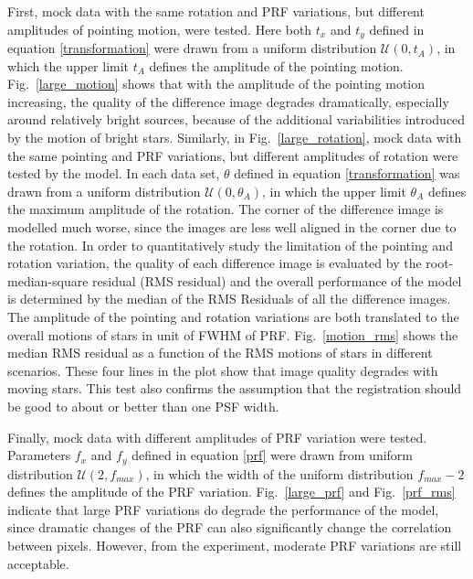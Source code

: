 First, mock data with the same rotation and PRF variations, but different amplitudes of pointing motion, were tested.
Here both $t_x$ and $t_y$ defined in equation \ref{transformation} were drawn from a uniform distribution ${\mathcal {U}}(0,t_A)$, in which the upper limit $t_A$ defines the amplitude of the pointing motion.
Fig.~\ref{large_motion} shows that with the amplitude of the pointing motion increasing,  the quality of the difference image degrades dramatically, especially around relatively bright sources, because of the additional variabilities introduced by the motion of bright stars.
Similarly, in Fig.~\ref{large_rotation}, mock data with the same pointing and PRF variations, but different amplitudes of rotation were tested by the model.
In each data set, $\theta$ defined in equation \ref{transformation} was drawn from a uniform distribution ${\mathcal {U}}(0,\theta_A)$, in which the upper limit $\theta_A$ defines the maximum amplitude of the rotation.
The corner of the difference image is modelled much worse, since the images are less well aligned in the corner due to the rotation. 
In order to quantitatively study the limitation of the pointing and rotation variation, the quality of each difference image is evaluated by the root-median-square residual (RMS residual) and the overall performance of the model is determined by the median of the RMS Residuals of all the difference images.
The amplitude of the pointing and rotation variations are both translated to the overall motions of stars in unit of FWHM of PRF.
Fig.~\ref{motion_rms} shows the median RMS residual as a function of the RMS motions of stars in different scenarios. 
These four lines in the plot show that image quality degrades with moving stars.
This test also confirms the assumption that the registration should be good to about or better than one PSF width.

Finally, mock data with different amplitudes of PRF variation were tested.
Parameters $f_x$ and $f_y$ defined in equation \ref{prf} were drawn from uniform distribution ${\mathcal {U}}(2,f_{max})$, in which the width of the uniform distribution $f_{max}-2$ defines the amplitude of the PRF variation.
Fig.~\ref{large_prf} and Fig.~\ref{prf_rms} indicate that large PRF variations do degrade the performance of the model, since dramatic changes of the PRF can also significantly change the correlation between pixels.
However, from the experiment, moderate PRF variations are still acceptable. 

